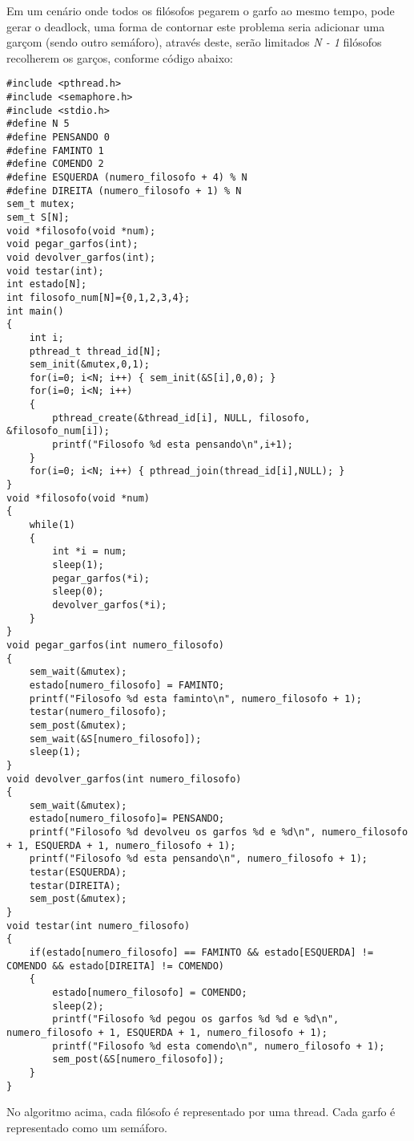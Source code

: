 \documentclass[10pt]{article}
\begin{document}
Em um cenário onde todos os filósofos pegarem o garfo ao mesmo tempo, pode gerar o deadlock, uma forma de contornar este problema seria adicionar uma garçom (sendo outro semáforo), através deste, serão limitados \textit{N - 1} filósofos recolherem os garços, conforme código abaixo:
\begin{lstlisting}
#include <pthread.h>
#include <semaphore.h>
#include <stdio.h>
#define N 5
#define PENSANDO 0
#define FAMINTO 1
#define COMENDO 2
#define ESQUERDA (numero_filosofo + 4) % N
#define DIREITA (numero_filosofo + 1) % N
sem_t mutex;
sem_t S[N];
void *filosofo(void *num);
void pegar_garfos(int);
void devolver_garfos(int);
void testar(int);
int estado[N];
int filosofo_num[N]={0,1,2,3,4};
int main()
{
    int i;
    pthread_t thread_id[N];
    sem_init(&mutex,0,1);
    for(i=0; i<N; i++) { sem_init(&S[i],0,0); }
    for(i=0; i<N; i++)
    {
        pthread_create(&thread_id[i], NULL, filosofo, &filosofo_num[i]);
        printf("Filosofo %d esta pensando\n",i+1);
    }
    for(i=0; i<N; i++) { pthread_join(thread_id[i],NULL); }
}
void *filosofo(void *num)
{
    while(1)
    {
        int *i = num;
        sleep(1);
        pegar_garfos(*i);
        sleep(0);
        devolver_garfos(*i);
    }
}
void pegar_garfos(int numero_filosofo)
{
    sem_wait(&mutex);
    estado[numero_filosofo] = FAMINTO;
    printf("Filosofo %d esta faminto\n", numero_filosofo + 1);
    testar(numero_filosofo);
    sem_post(&mutex);
    sem_wait(&S[numero_filosofo]);
    sleep(1);
}
void devolver_garfos(int numero_filosofo)
{
    sem_wait(&mutex);
    estado[numero_filosofo]= PENSANDO;
    printf("Filosofo %d devolveu os garfos %d e %d\n", numero_filosofo + 1, ESQUERDA + 1, numero_filosofo + 1);
    printf("Filosofo %d esta pensando\n", numero_filosofo + 1);
    testar(ESQUERDA);
    testar(DIREITA);
    sem_post(&mutex);
}
void testar(int numero_filosofo)
{
    if(estado[numero_filosofo] == FAMINTO && estado[ESQUERDA] != COMENDO && estado[DIREITA] != COMENDO)
    {
        estado[numero_filosofo] = COMENDO;
        sleep(2);
        printf("Filosofo %d pegou os garfos %d %d e %d\n", numero_filosofo + 1, ESQUERDA + 1, numero_filosofo + 1);
        printf("Filosofo %d esta comendo\n", numero_filosofo + 1);
        sem_post(&S[numero_filosofo]);
    }
}
\end{lstlisting}
No algoritmo acima, cada filósofo é representado por uma thread. Cada garfo é representado como um semáforo.
\end{document}
